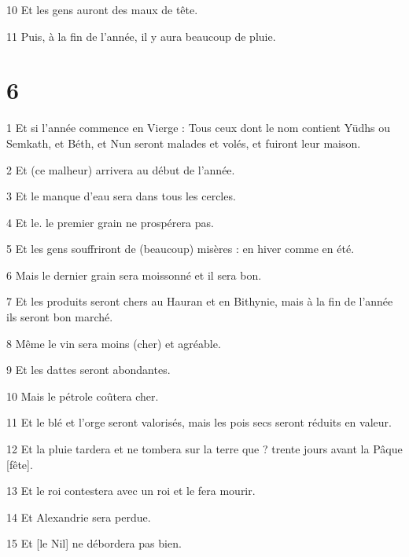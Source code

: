 \par 10 Et les gens auront des maux de tête.

\par 11 Puis, à la fin de l'année, il y aura beaucoup de pluie.


\chapter{6}

\par 1 Et si l'année commence en Vierge : Tous ceux dont le nom contient Yūdhs ou Semkath, et Béth, et Nun seront malades et volés, et fuiront leur maison.

\par 2 Et (ce malheur) arrivera au début de l'année.

\par 3 Et le manque d'eau sera dans tous les cercles.

\par 4 Et le. le premier grain ne prospérera pas.

\par 5 Et les gens souffriront de (beaucoup) misères : en hiver comme en été.

\par 6 Mais le dernier grain sera moissonné et il sera bon.

\par 7 Et les produits seront chers au Hauran et en Bithynie, mais à la fin de l'année ils seront bon marché.

\par 8 Même le vin sera moins (cher) et agréable.

\par 9 Et les dattes seront abondantes.

\par 10 Mais le pétrole coûtera cher.

\par 11 Et le blé et l'orge seront valorisés, mais les pois secs seront réduits en valeur.

\par 12 Et la pluie tardera et ne tombera sur la terre que ? trente jours avant la Pâque [fête].

\par 13 Et le roi contestera avec un roi et le fera mourir.

\par 14 Et Alexandrie sera perdue.

\par 15 Et [le Nil] ne débordera pas bien.

